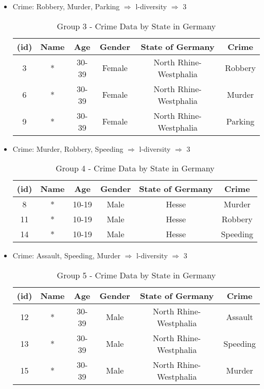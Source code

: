 \documentclass[a4 paper]{article}
\numberwithin{equation}{section}
\newcommand{\0}{\mathbf{0}}
\begin{document}
\begin{itemize}
    \item Crime: Robbery, Murder, Parking $\Rightarrow$ l-diversity $\Rightarrow$ 3
    \begin{table}[H]
        \centering
        \caption{Group 3 - Crime Data by State in Germany}
        \label{tab:crime_data-3}
        \begin{tabular}{cccccc}
            \toprule
            \textbf{(id)} & \textbf{Name} & \textbf{Age} & \textbf{Gender} & \textbf{State of Germany} & \textbf{Crime} \\ \midrule
            3  & *  & 30-39  & Female & North Rhine-Westphalia & Robbery  \\ \midrule
            6  & *  & 30-39  & Female & North Rhine-Westphalia & Murder   \\ \midrule
            9  & *  & 30-39  & Female & North Rhine-Westphalia & Parking  \\ \bottomrule
        \end{tabular}
    \end{table}

    \item Crime: Murder, Robbery, Speeding $\Rightarrow$ l-diversity $\Rightarrow$ 3
    \begin{table}[H]
        \centering
        \caption{Group 4 - Crime Data by State in Germany}
        \label{tab:crime_data-4}
        \begin{tabular}{cccccc}
            \toprule
            \textbf{(id)} & \textbf{Name} & \textbf{Age} & \textbf{Gender} & \textbf{State of Germany} & \textbf{Crime} \\ \midrule
            8  & *  & 10-19  & Male   & Hesse                  & Murder   \\ \midrule
            11 & *  & 10-19  & Male   & Hesse                  & Robbery  \\ \midrule
            14 & *  & 10-19  & Male   & Hesse                  & Speeding \\ \bottomrule
        \end{tabular}
    \end{table}

    \item Crime: Assault, Speeding, Murder $\Rightarrow$ l-diversity $\Rightarrow$ 3
    \begin{table}[H]
        \centering
        \caption{Group 5 - Crime Data by State in Germany}
        \label{tab:crime_data-5}
        \begin{tabular}{cccccc}
            \toprule
            \textbf{(id)} & \textbf{Name} & \textbf{Age} & \textbf{Gender} & \textbf{State of Germany} & \textbf{Crime} \\ \midrule
            12 & *  & 30-39  & Male   & North Rhine-Westphalia & Assault  \\ \midrule
            13 & *  & 30-39  & Male   & North Rhine-Westphalia & Speeding \\ \midrule
            15 & *  & 30-39  & Male   & North Rhine-Westphalia & Murder   \\ \bottomrule
        \end{tabular}
    \end{table}
\end{itemize}
\end{document}
